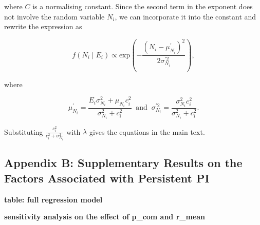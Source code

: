 \documentclass[
  11pt,
]{article}
\begin{document}
where \(C\) is a normalising constant. Since the second term in the
exponent does not involve the random variable \(N_i\), we can
incorporate it into the constant and rewrite the expression as

\begin{equation*}
  f(N_i \mid E_i) \propto \text{exp}(- \frac{(N_i - \mu_{N_i}^{\prime})^2}{2\sigma_{N_i}^{\prime2}}),
\end{equation*}

where

\begin{equation*}
  \mu_{N_i}^{\prime} = \frac{E_i \sigma_{N_i}^2 + \mu_{N_i} c_i^2}{\sigma_{N_i}^2 + c_i^2} \;\; \text{and} \;\; \sigma_{N_i}^{\prime2} = \frac{\sigma_{N_i}^2 c_i^2}{\sigma_{N_i}^2 + c_i^2}.
\end{equation*}

Substituting \(\frac{c_i^2}{c_i^2 + \sigma_{N_i}^2}\) with \(\lambda\)
gives the equations in the main text.

\hypertarget{appendix-b-supplementary-results-on-the-factors-associated-with-persistent-pi}{%
\subsection{Appendix B: Supplementary Results on the Factors Associated
with Persistent
PI}\label{appendix-b-supplementary-results-on-the-factors-associated-with-persistent-pi}}

\textbf{table: full regression model}

\textbf{sensitivity analysis on the effect of p\_com and r\_mean}
\end{document}

